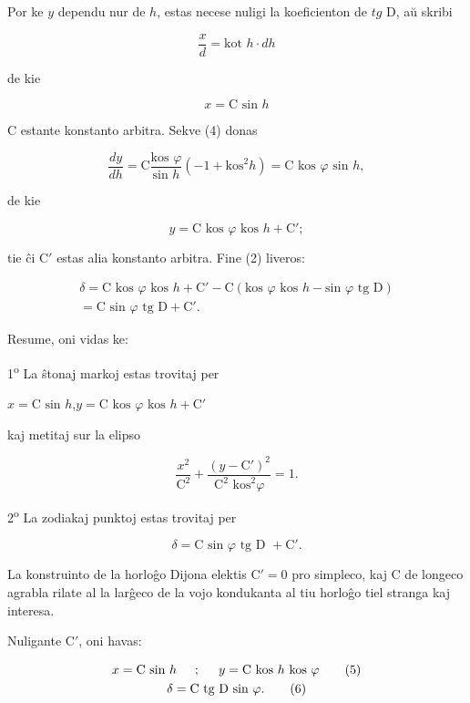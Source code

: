    Por ke $y$ dependu nur de $h$, estas necese nuligi la koeficienton de $tg$ D, a\u u skribi

\[\frac{x}{d} = \text{kot }h \cdot dh\]

de kie

\[x = \text{C sin }h\]

C estante konstanto arbitra. Sekve (4) donas

\[\frac{dy}{dh} = \text{C}\frac{\text{kos }\varphi}{\text{sin }h} \left(-1 + \text{kos}^2 h \right) =  \text{C kos }\varphi\text{ sin } h,\]

de kie

\[y = \text{C kos }\varphi\text{ kos }h + \text{C}';\]

tie \^ci C$'$ estas alia konstanto arbitra. Fine (2) liveros:

\begin{gather*}
\delta = \text{C kos }\varphi\text{ kos }h + \text{C}' - \text{C}(\text{kos }\varphi\text{ kos }h - \text{sin }\varphi\text{ tg D})\\
         = \text{C sin }\varphi\text{ tg D} + \text{C}'.
\end{gather*}

Resume, oni vidas ke:

1\textsuperscript{o} La \^stonaj markoj estas trovitaj per

\begin{center}
$x = \text{C sin }h$,\hspace{0.5cm}$y = \text{C kos }\varphi\text{ kos }h + \text{C}'$
\end{center}

kaj metitaj sur la elipso

\[\frac{x^2}{\text{C}^2} + \frac{(y - \text{C}')^2}{\text{C}^2\text{ kos}^2 \varphi} = 1.\]

2\textsuperscript{o} La zodiakaj punktoj estas trovitaj per

\[\delta = \text{C sin }\varphi \text{ tg D } + \text{C}'.\]

   La konstruinto de la horlo\^go Dijona elektis $\text{C}'=0$ pro simpleco, kaj
C de longeco agrabla rilate al la lar\^geco de la vojo kondukanta
al tiu horlo\^go tiel stranga kaj interesa.

   Nuligante C$'$, oni havas:

\begin{gather*}
x = \text{C sin }h \hspace{0.5cm};\hspace{0.5cm} y = \text{C kos }h\text{ kos }\varphi \tag{5}\\
\delta = \text{C tg D sin }\varphi. \tag{6}
\end{gather*}

